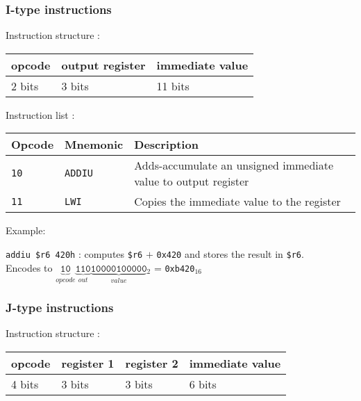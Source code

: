 \documentclass[a4paper]{report}
\begin{document}
\subsubsection{I-type instructions}

Instruction structure :

\begin{center}
	\begin{tabular}{|l|l|l|}
		\hline
		opcode & output register & immediate value \\
		\hline
		2 bits & 3 bits & 11 bits \\
		\hline
	\end{tabular}
\end{center}

Instruction list :

\begin{center}
	\begin{tabular}{|l|l|l|}
		\hline
		Opcode & Mnemonic & Description \\
		\hline \hline
		\texttt{10} & \texttt{ADDIU} & Adds-accumulate an unsigned immediate
		                               value to output register \\
		\texttt{11} & \texttt{LWI} &   Copies the immediate value to
		                               the register \\
		\hline
	\end{tabular}
\end{center}

Example:

\texttt{addiu \$r6 420h} : computes \texttt{\$r6} $+$ \texttt{0x420} and stores
the result in \texttt{\$r6}. \\
Encodes to ${
	\underbrace{\texttt{10}}_{opcode}
	\underbrace{\texttt{110}}_{out}
	\underbrace{\texttt{10000100000}}_{value}\mbox{}_2
}$ = \texttt{0xb420}$_{16}$

\subsubsection{J-type instructions}

Instruction structure :

\begin{center}
	\begin{tabular}{|l|l|l|l|}
		\hline
		opcode & register 1 & register 2 & immediate value \\
		\hline
		4 bits & 3 bits & 3 bits & 6 bits \\
		\hline
	\end{tabular}
\end{center}
\end{document}
